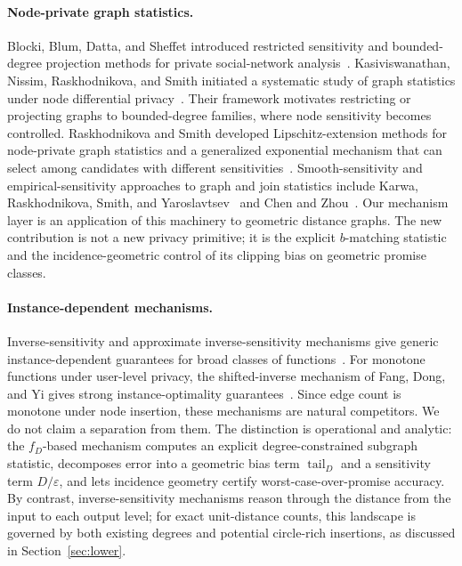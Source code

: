 \documentclass[11pt]{article}
\newcommand{\eps}{\varepsilon}
\newcommand{\tail}{\operatorname{tail}}
\begin{document}
\paragraph{Node-private graph statistics.}
Blocki, Blum, Datta, and Sheffet introduced restricted sensitivity and bounded-degree projection methods for private social-network analysis~\cite{BBDS13}. Kasiviswanathan, Nissim, Raskhodnikova, and Smith initiated a systematic study of graph statistics under node differential privacy~\cite{KNRS13}. Their framework motivates restricting or projecting graphs to bounded-degree families, where node sensitivity becomes controlled.
Raskhodnikova and Smith developed Lipschitz-extension methods for node-private graph statistics and a generalized exponential mechanism that can select among candidates with different sensitivities~\cite{RS16}. Smooth-sensitivity and empirical-sensitivity approaches to graph and join statistics include Karwa, Raskhodnikova, Smith, and Yaroslavtsev~\cite{KRSY14} and Chen and Zhou~\cite{ChenZhou13}. Our mechanism layer is an application of this machinery to geometric distance graphs. The new contribution is not a new privacy primitive; it is the explicit \(b\)-matching statistic and the incidence-geometric control of its clipping bias on geometric promise classes.

\paragraph{Instance-dependent mechanisms.}
Inverse-sensitivity and approximate inverse-sensitivity mechanisms give generic instance-dependent guarantees for broad classes of functions~\cite{AsiDuchi20}. For monotone functions under user-level privacy, the shifted-inverse mechanism of Fang, Dong, and Yi gives strong instance-optimality guarantees~\cite{FDY22}. Since edge count is monotone under node insertion, these mechanisms are natural competitors. We do not claim a separation from them. The distinction is operational and analytic: the \(f_D\)-based mechanism computes an explicit degree-constrained subgraph statistic, decomposes error into a geometric bias term \(\tail_D\) and a sensitivity term \(D/\eps\), and lets incidence geometry certify worst-case-over-promise accuracy. By contrast, inverse-sensitivity mechanisms reason through the distance from the input to each output level; for exact unit-distance counts, this landscape is governed by both existing degrees and potential circle-rich insertions, as discussed in Section~\ref{sec:lower}.
\end{document}
